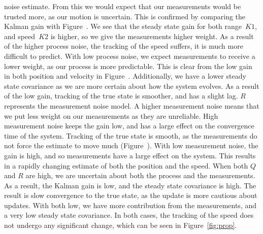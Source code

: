 \documentclass[a4paper,12pt]{article}
\begin{document}
\begin{enumerate}
  noise estimate. From this we would expect that our measurements would be
  trusted more, as our motion is uncertain. This is confirmed by comparing the
  Kalman gain with Figure~. We see that the steady state gain
  for both range~$K1$, and speed~$K2$ is higher, so we give the measurements
  higher weight. As a result of the higher process noise, the tracking of the
  speed suffers, it is much more difficult to predict. With low process noise,
  we expect measurements to receive a lower weight, as our process is more
  predictable. This is clear from the low gain in both position and velocity in
  Figure~. Additionally, we have a lower steady state
  covariance as we are more certain about how the system evolves. As a result of
  the low gain, tracking of the true state is smoother, and has a slight
  lag. $R$ represents the measurement noise model. A higher measurement noise
  means that we put less weight on our measurements as they are unreliable. High
  measurement noise keeps the gain low, and has a large effect on the
  convergence time of the system. Tracking of the true state is smooth, as the
  measurements do not force the estimate to move much
  (Figure~). With low measurement noise, the gain is high, and
  so measurements have a large effect on the system. This results in a rapidly
  changing estimate of both the position and the speed. When both $Q$
  and $R$ are high, we are uncertain about both the process and the
  measurements. As a result, the Kalman gain is low, and the steady state
  covariance is high. The result is slow convergence to the true state, as the
  update is more cautious about updates. With both low, we have more
  contribution from the measurements, and a very low steady state covariance. In
  both cases, the tracking of the speed does not undergo any significant change,
  which can be seen in Figure~\ref{fig:prop}.


\end{enumerate}
\end{document}

